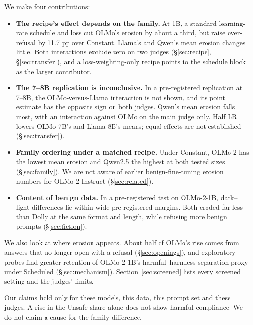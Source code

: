 \documentclass[11pt]{article}
\begin{document}
We make four contributions:
\begin{itemize}
  \item \textbf{The recipe's effect depends on the family.} At 1B, a standard
        learning-rate schedule and loss cut OLMo's erosion by about a third,
        but raise over-refusal by 11.7 pp over Constant. Llama's and Qwen's
        mean erosion changes little. Both interactions exclude zero on two judges
        (\S\ref{sec:recipe}, \S\ref{sec:transfer}), and a loss-weighting-only
        recipe points to the schedule block as the larger contributor.
  \item \textbf{The 7--8B replication is inconclusive.} In a
        pre-registered replication at 7--8B, the OLMo-versus-Llama interaction
        is not shown, and its point estimate has the opposite sign on both
        judges. Qwen's mean erosion falls most, with an interaction against
        OLMo on the main judge only. Half LR lowers OLMo-7B's and Llama-8B's
        means; equal effects are not established (\S\ref{sec:transfer}).
  \item \textbf{Family ordering under a matched recipe.} Under Constant,
        OLMo-2 has the lowest mean erosion and Qwen2.5 the highest at both
        tested sizes (\S\ref{sec:family}). We are not aware of
        earlier benign-fine-tuning erosion numbers for OLMo-2 Instruct
        (\S\ref{sec:related}).
  \item \textbf{Content of benign data.} In a pre-registered test on
        OLMo-2-1B, dark--light differences lie within wide pre-registered
        margins. Both eroded far less than Dolly at the same format and length, while
        refusing more benign prompts (\S\ref{sec:fiction}).
\end{itemize}

We also look at where erosion appears. About half of OLMo's rise comes from
answers that no longer open with a refusal (\S\ref{sec:openings}), and
exploratory probes find greater retention of OLMo-2-1B's harmful--harmless
separation proxy under Scheduled (\S\ref{sec:mechanism}).
Section~\ref{sec:screened} lists every screened setting and the judges' limits.

Our claims hold only for these models, this data, this prompt set and these
judges. A rise in the Unsafe share alone does not show harmful compliance. We
do not claim a cause for the family difference.
\end{document}
